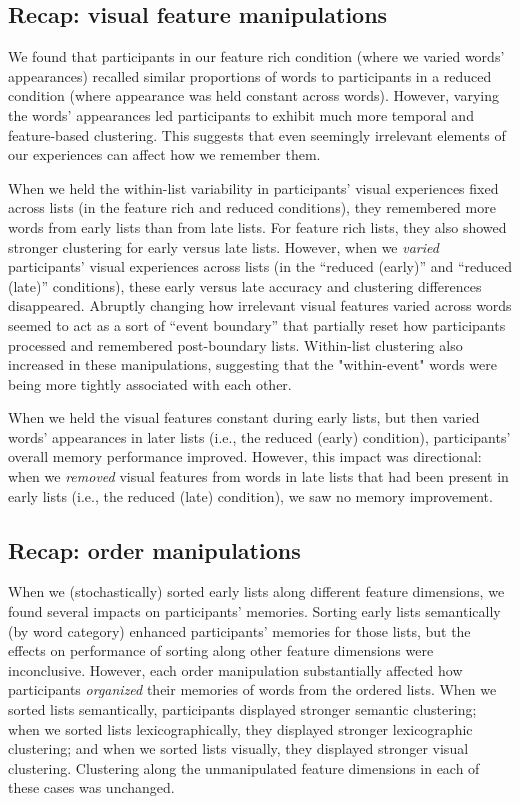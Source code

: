 \documentclass[11pt]{article}
\begin{document}
\subsection*{Recap: visual feature manipulations}

We found that participants in our feature rich condition (where we varied
words' appearances) recalled similar proportions of words to participants in a
reduced condition (where appearance was held constant across words). However,
varying the words' appearances led participants to exhibit much more temporal
and feature-based clustering. This suggests that even seemingly irrelevant
elements of our experiences can affect how we remember them.

When we held the within-list variability in participants' visual experiences
fixed across lists (in the feature rich and reduced conditions), they
remembered more words from early lists than from late lists. For feature rich
lists, they also showed stronger clustering for early versus late lists.
However, when we \textit{varied} participants' visual experiences across lists
(in the ``reduced (early)'' and ``reduced (late)'' conditions), these early
versus late accuracy and clustering differences disappeared. Abruptly changing
how irrelevant visual features varied across words seemed to act as a sort of
``event boundary'' that partially reset how participants processed and
remembered post-boundary lists. Within-list clustering also increased in these
manipulations, suggesting that the "within-event" words were being more tightly
associated with each other.

When we held the visual features constant during early lists, but then varied
words' appearances in later lists (i.e., the reduced (early) condition),
participants' overall memory performance improved. However, this impact was
directional: when we \textit{removed} visual features from words in late lists
that had been present in early lists (i.e., the reduced (late) condition), we
saw no memory improvement.

\subsection*{Recap: order manipulations}

When we (stochastically) sorted early lists along different feature dimensions,
we found several impacts on participants' memories. Sorting early lists
semantically (by word category) enhanced participants' memories for those
lists, but the effects on performance of sorting along other feature dimensions
were inconclusive. However, each order manipulation substantially affected how
participants \textit{organized} their memories of words from the ordered lists.
When we sorted lists semantically, participants displayed stronger semantic
clustering; when we sorted lists lexicographically, they displayed stronger
lexicographic clustering; and when we sorted lists visually, they displayed
stronger visual clustering. Clustering along the unmanipulated feature
dimensions in each of these cases was unchanged.
\end{document}
